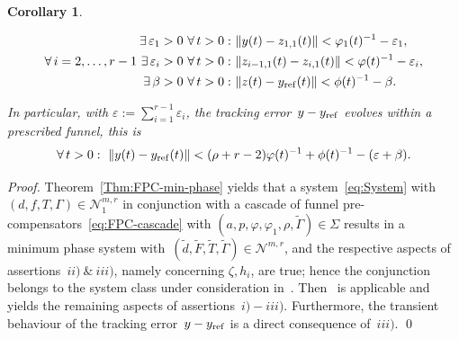 \documentclass[ envcountsect, envcountsame]{svjour3}
\newtheorem{Corollary}[Theorem]{Corollary}
\newcommand{\cN}{\mathcal{N}}
\newcommand{\vp}{\varphi}
\newcommand{\ve}{\varepsilon}
\begin{document}
\begin{Corollary}
\begin{itemize}
\begin{equation*}
\begin{aligned}
\exists\, \ve_1 > 0 \ \forall\, t > 0: \ & \|y(t) - z_{1,1}(t) \| < \vp_1(t)^{-1} - \ve_1 , \\
\forall\, i=2,\ldots,r-1 \ \exists\, \ve_i > 0 \ \forall\, t > 0: \ & \|z_{i-1,1}(t) - z_{i,1}(t) \| < \vp(t)^{-1} - \ve_i , \\
\exists\, \beta > 0 \ \forall\, t > 0: \ & \|z(t) - y_{\rm ref}(t) \| < \phi(t)^{-1} - \beta.
\end{aligned}
\end{equation*}
\end{itemize}
In particular, with $\ve := \sum_{i=1}^{r-1} \ve_i$, the tracking error~$y - y_{\rm ref}$ evolves within a prescribed funnel, this is
\begin{equation*}
\forall \, t > 0: \ \|y(t) - y_{\rm ref}(t) \| < (\rho+r-2)\vp(t)^{-1} + \phi(t)^{-1} - (\ve + \beta) . 
\end{equation*}
\end{Corollary}
\begin{proof}
Theorem~\ref{Thm:FPC-min-phase} yields that a system~\eqref{eq:System} with~$(d,f,T,\Gamma) \in \cN^{m,r}_1$ in conjunction with a cascade of funnel pre-compensators~\eqref{eq:FPC-cascade} with $(a,p,\vp,\vp_1,\rho,\tilde \Gamma) \in \Sigma$
results in a minimum phase system with~$(\tilde d, \tilde F, \tilde T, \tilde \Gamma) \in \cN^{m,r}$, and the respective aspects of assertions~$ii)~\&~iii)$, namely concerning $\zeta, h_i$, are true; hence the conjunction belongs to the system class under consideration in~\cite{BergIlch21}.
Then~\cite[Thm. 1.9]{BergIlch21} is applicable and yields the remaining aspects of assertions~$i)-iii)$.
Furthermore, the transient behaviour of the tracking error~$y-y_{\rm ref}$ is a direct consequence of~$iii)$.
\qed
\end{proof}
\end{document}
